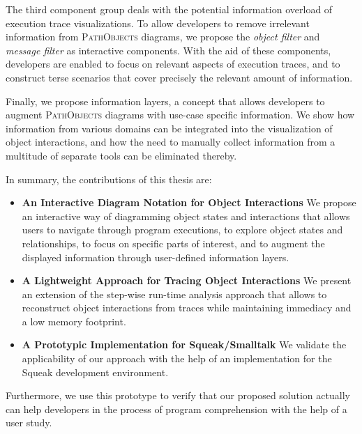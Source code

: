 The third component group deals with the potential information overload of execution trace visualizations.
To allow developers to remove irrelevant information from \textsc{PathObjects} diagrams, we propose the \emph{object filter} and \emph{message filter} as interactive components.
With the aid of these components, developers are enabled to focus on relevant aspects of execution traces, and to construct terse scenarios that cover precisely the relevant amount of information.

Finally, we propose information layers, a concept that allows developers to augment \textsc{PathObjects} diagrams with use-case specific information.
We show how information from various domains can be integrated into the visualization of object interactions, and how the need to manually collect information from a multitude of separate tools can be eliminated thereby.

In summary, the contributions of this thesis are:

\begin{itemize}
\renewcommand{\labelitemiv}{$\ast$}

\item \textbf{An Interactive Diagram Notation for Object Interactions} We propose an interactive way of diagramming object states and interactions that allows users to navigate through program executions, to explore object states and relationships, to focus on specific parts of interest, and to augment the displayed information through user-defined information layers.

\item \textbf{A Lightweight Approach for Tracing Object Interactions} We present an extension of the step-wise run-time analysis approach that allows to reconstruct object interactions from traces while maintaining immediacy and a low memory footprint.

\item \textbf{A Prototypic Implementation for Squeak/Smalltalk} We validate the applicability of our approach with the help of an implementation for the Squeak development environment.
\end{itemize}

Furthermore, we use this prototype to verify that our proposed solution actually can help developers in the process of program comprehension with the help of a user study. 

